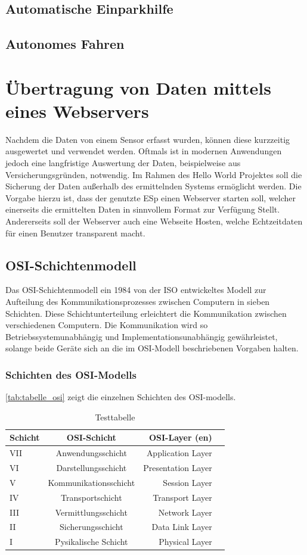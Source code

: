 \subsection{Automatische Einparkhilfe}
\subsection{Autonomes Fahren}

\section{Übertragung von Daten mittels eines Webservers}
Nachdem die Daten von einem Sensor erfasst wurden, können diese kurzzeitig ausgewertet und verwendet werden. Oftmals ist in modernen Anwendungen jedoch eine langfristige Auswertung der Daten, beispielweise aus Versicherungsgründen, notwendig. Im Rahmen des Hello World Projektes soll die Sicherung der Daten außerhalb des ermittelnden Systems ermöglicht werden. Die Vorgabe hierzu ist, dass der genutzte ESp einen Webserver starten soll, welcher einerseits die ermittelten Daten in sinnvollem Format zur Verfügung Stellt. Andererseits soll der Webserver auch eine Webseite Hosten, welche Echtzeitdaten für einen Benutzer transparent macht.

\subsection{OSI-Schichtenmodell}
Das \ac{OSI}-Schichtenmodell ein 1984 von der  \ac{ISO} entwickeltes Modell zur Aufteilung des Kommunikationsprozesses zwischen Computern in sieben Schichten. Diese Schichtunterteilung erleichtert die Kommunikation zwischen verschiedenen Computern. Die Kommunikation wird so Betriebssystemunabhängig und Implementationsunabhängig gewährleistet, solange beide Geräte sich an die im \ac{OSI}-Modell beschriebenen Vorgaben halten.

\subsubsection{Schichten des  \ac{OSI}-Modells} 
\autoref{tab:tabelle_osi} zeigt die einzelnen Schichten des OSI-modells.
\begin{table}[h!]
	\centering
	\begin{tabular}{p{3cm}crl}
		\textbf{Schicht} & \textbf{\ac{OSI}-Schicht} &\textbf{\ac{OSI}-Layer (en)} \\\toprule
		VII &  Anwendungsschicht & Application Layer\\
		VI &  Darstellungsschicht & Presentation Layer\\
		V &  Kommunikationsschicht & Session Layer\\
		IV &  Transportschicht & Transport Layer\\
		III &  Vermittlungsschicht & Network Layer\\
		II &  Sicherungsschicht & Data Link Layer\\
		I &  Pysikalische Schicht & Physical Layer\\\bottomrule
	\end{tabular}
	\caption[\ac{OSI}-Schichten]{\label{tab:tabelle_osi}Testtabelle}
\end{table}

